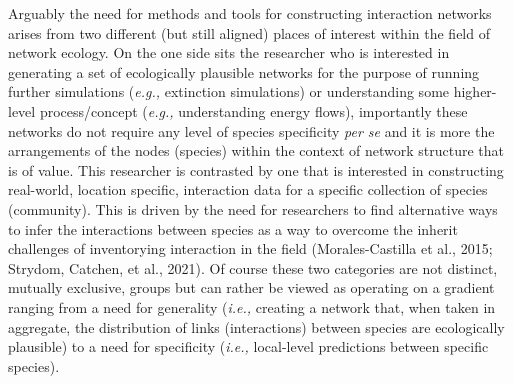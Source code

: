 \documentclass[
]{agujournal2019}
\begin{document}
Arguably the need for methods and tools for constructing interaction
networks arises from two different (but still aligned) places of
interest within the field of network ecology. On the one side sits the
researcher who is interested in generating a set of ecologically
plausible networks for the purpose of running further simulations
(\emph{e.g.,} extinction simulations) or understanding some higher-level
process/concept (\emph{e.g.,} understanding energy flows), importantly
these networks do not require any level of species specificity \emph{per
se} and it is more the arrangements of the nodes (species) within the
context of network structure that is of value. This researcher is
contrasted by one that is interested in constructing real-world,
location specific, interaction data for a specific collection of species
(community). This is driven by the need for researchers to find
alternative ways to infer the interactions between species as a way to
overcome the inherit challenges of inventorying interaction in the field
(Morales-Castilla et al., 2015; Strydom, Catchen, et al., 2021). Of
course these two categories are not distinct, mutually exclusive, groups
but can rather be viewed as operating on a gradient ranging from a need
for generality (\emph{i.e.,} creating a network that, when taken in
aggregate, the distribution of links (interactions) between species are
ecologically plausible) to a need for specificity (\emph{i.e.,}
local-level predictions between specific species).
\end{document}
